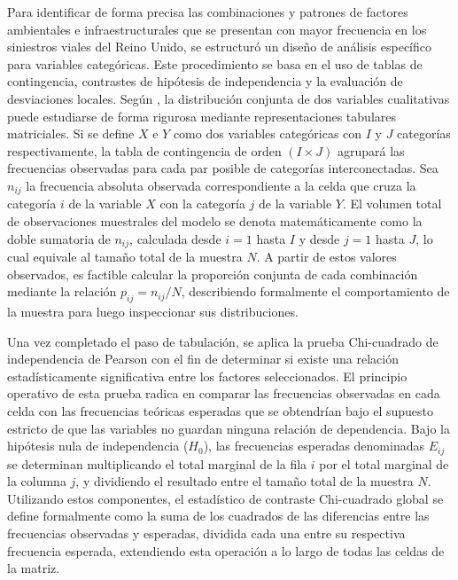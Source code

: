 \documentclass[12pt]{article}
\begin{document}
  Para identificar de forma precisa las combinaciones y patrones de factores 
  ambientales e infraestructurales que se presentan con mayor frecuencia en los
  siniestros viales del Reino Unido, se estructuró un diseño de análisis específico 
  para variables categóricas. Este procedimiento se basa en el uso de tablas de 
  contingencia, contrastes de hipótesis de independencia y la evaluación de desviaciones
  locales. Según \textcite{LASTRE2019}, la distribución conjunta de dos variables 
  cualitativas puede estudiarse de forma rigurosa mediante representaciones tabulares 
  matriciales. Si se define $X$ e $Y$ como dos variables categóricas con $I$ y $J$ 
  categorías respectivamente, la tabla de contingencia de orden $(I \times J)$ 
  agrupará las frecuencias observadas para cada par posible de categorías interconectadas. 
  Sea $n_{ij}$ la frecuencia absoluta observada correspondiente a la celda que 
  cruza la categoría $i$ de la variable $X$ con la categoría $j$ de la variable $Y$. 
  El volumen total de observaciones muestrales del modelo se denota matemáticamente 
  como la doble sumatoria de $n_{ij}$, calculada desde $i=1$ hasta $I$ y desde 
  $j=1$ hasta $J$, lo cual equivale al tamaño total de la muestra $N$. A partir 
  de estos valores observados, es factible calcular la proporción conjunta de 
  cada combinación mediante la relación $p_{ij} = n_{ij} / N$, describiendo formalmente 
  el comportamiento de la muestra para luego inspeccionar sus distribuciones.
  
  Una vez completado el paso de tabulación, se aplica la prueba Chi-cuadrado de 
  independencia de Pearson con el fin de determinar si existe una relación estadísticamente 
  significativa entre los factores seleccionados. El principio operativo de esta
  prueba radica en comparar las frecuencias observadas en cada celda con las frecuencias 
  teóricas esperadas que se obtendrían bajo el supuesto estricto de que las variables
  no guardan ninguna relación de dependencia. Bajo la hipótesis nula de independencia 
  ($H_0$), las frecuencias esperadas denominadas $E_{ij}$ se determinan multiplicando 
  el total marginal de la fila $i$ por el total marginal de la columna $j$, y 
  dividiendo el resultado entre el tamaño total de la muestra $N$. Utilizando estos 
  componentes, el estadístico de contraste Chi-cuadrado global se define formalmente 
  como la suma de los cuadrados de las diferencias entre las frecuencias observadas 
  y esperadas, dividida cada una entre su respectiva frecuencia esperada, extendiendo 
  esta operación a lo largo de todas las celdas de la matriz.
  
\end{document}
